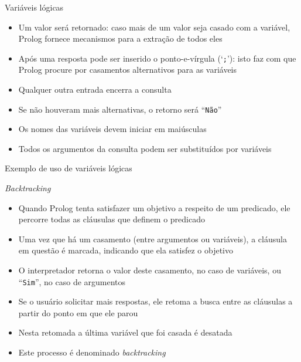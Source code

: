 \begin{frame}[fragile]{Variáveis lógicas}

    \begin{itemize}
        \item Um valor será retornado: caso mais de um valor seja casado com a variável, 
            Prolog fornece mecanismos para a extração de todos eles

        \item Após uma resposta pode ser inserido o ponto-e-vírgula (`\texttt{;}'): isto faz 
            com que Prolog procure por casamentos alternativos para as variáveis

        \item Qualquer outra entrada encerra a consulta

        \item Se não houveram mais alternativas, o retorno será ``\texttt{Não}'' 

        \item Os nomes das variáveis devem iniciar em maiúsculas

        \item Todos os argumentos da consulta podem ser substituídos por variáveis

    \end{itemize}

\end{frame}

\begin{frame}[fragile]{Exemplo de uso de variáveis lógicas}


\end{frame}

\begin{frame}[fragile]{\it Backtracking}

    \begin{itemize}
        \item Quando Prolog tenta satisfazer um objetivo a respeito de um predicado, ele 
            percorre todas as cláusulas que definem o predicado

        \item Uma vez que há um casamento (entre argumentos ou variáveis), a cláusula em 
            questão é marcada, indicando que ela satisfez o objetivo

        \item  O interpretador retorna o valor deste casamento, no caso de variáveis, ou 
            ``\texttt{Sim}'', no caso de argumentos

        \item Se o usuário solicitar mais respostas, ele retoma a busca entre as cláusulas a 
            partir do ponto em que ele parou

        \item Nesta retomada a última variável que foi casada é desatada 

        \item Este processo é denominado \textit{backtracking}

    \end{itemize}

\end{frame}

